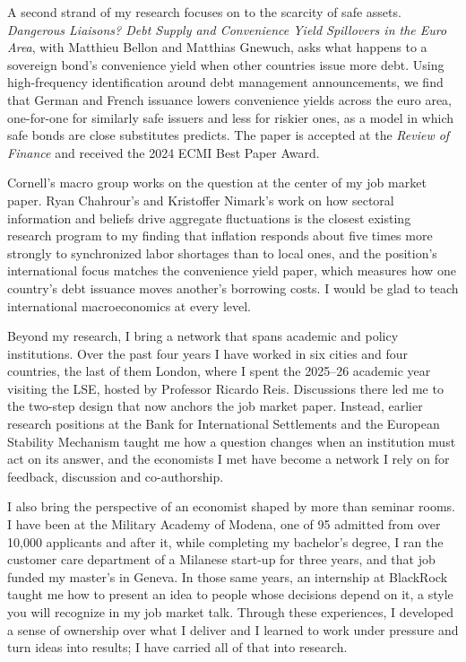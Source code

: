 \documentclass[11pt]{article}
\begin{document}
A second strand of my research focuses on to the scarcity of safe assets. \textit{Dangerous Liaisons? Debt Supply and Convenience Yield Spillovers in the Euro Area}, with Matthieu Bellon and Matthias Gnewuch, asks what happens to a sovereign bond's convenience yield when other countries issue more debt. Using high-frequency identification around debt management announcements, we find that German and French issuance lowers convenience yields across the euro area, one-for-one for similarly safe issuers and less for riskier ones, as a model in which safe bonds are close substitutes predicts. The paper is accepted at the \textit{Review of Finance} and received the 2024 ECMI Best Paper Award.

Cornell's macro group works on the question at the center of my job market paper. Ryan Chahrour's and Kristoffer Nimark's work on how sectoral information and beliefs drive aggregate fluctuations is the closest existing research program to my finding that inflation responds about five times more strongly to synchronized labor shortages than to local ones, and the position's international focus matches the convenience yield paper, which measures how one country's debt issuance moves another's borrowing costs. I would be glad to teach international macroeconomics at every level.

Beyond my research, I bring a network that spans academic and policy institutions. Over the past four years I have worked in six cities and four countries, the last of them London, where I spent the 2025--26 academic year visiting the LSE, hosted by Professor Ricardo Reis. Discussions there led me to the two-step design that now anchors the job market paper. Instead, earlier research positions at the Bank for International Settlements and the European Stability Mechanism taught me how a question changes when an institution must act on its answer, and the economists I met have become a network I rely on for feedback, discussion and co-authorship.

I also bring the perspective of an economist shaped by more than seminar rooms. I have been at the Military Academy of Modena, one of 95 admitted from over 10,000 applicants and after it, while completing my bachelor's degree, I ran the customer care department of a Milanese start-up for three years, and that job funded my master's in Geneva. In those same years, an internship at BlackRock taught me how to present an idea to people whose decisions depend on it, a style you will recognize in my job market talk. Through these experiences, I developed a sense of ownership over what I deliver and I learned to work under pressure and turn ideas into results; I have carried all of that into research. %
\end{document}
